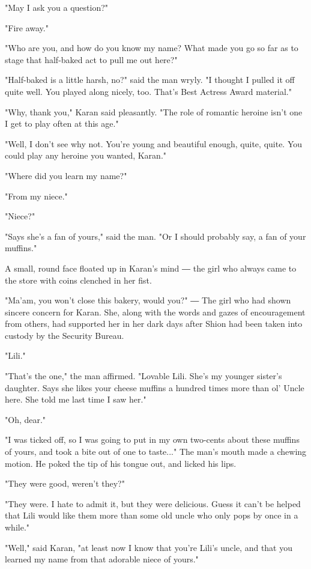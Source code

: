 "May I ask you a question?"

"Fire away."

"Who are you, and how do you know my name? What made you go so far as to
stage that half-baked act to pull me out here?"

"Half-baked is a little harsh, no?" said the man wryly. "I thought I
pulled it off quite well. You played along nicely, too. That's Best
Actress Award material."

"Why, thank you," Karan said pleasantly. "The role of romantic heroine
isn't one I get to play often at this age."

"Well, I don't see why not. You're young and beautiful enough, quite,
quite. You could play any heroine you wanted, Karan."

"Where did you learn my name?"

"From my niece."

"Niece?"

"Says she's a fan of yours," said the man. "Or I should probably say, a
fan of your muffins."

A small, round face floated up in Karan's mind ― the girl who always
came to the store with coins clenched in her fist.

"Ma'am, you won't close this bakery, would you?" ― The girl who had
shown sincere concern for Karan. She, along with the words and gazes of
encouragement from others, had supported her in her dark days after
Shion had been taken into custody by the Security Bureau.

"Lili."

"That's the one," the man affirmed. "Lovable Lili. She's my younger
sister's daughter. Says she likes your cheese muffins a hundred times
more than ol' Uncle here. She told me last time I saw her."

"Oh, dear."

"I was ticked off, so I was going to put in my own two-cents about these
muffins of yours, and took a bite out of one to taste..." The man's
mouth made a chewing motion. He poked the tip of his tongue out, and
licked his lips.

"They were good, weren't they?"

"They were. I hate to admit it, but they were delicious. Guess it can't
be helped that Lili would like them more than some old uncle who only
pops by once in a while."

"Well," said Karan, "at least now I know that you're Lili's uncle, and
that you learned my name from that adorable niece of yours."

